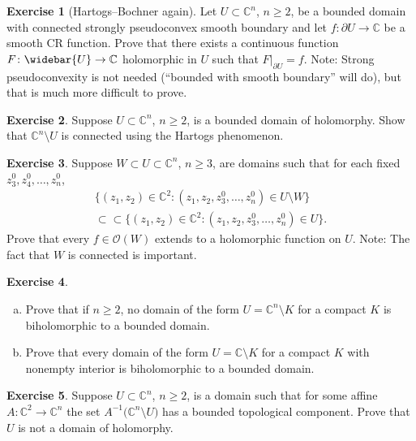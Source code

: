 \documentclass[12pt,openany]{book}
\newcommand{\C}{{\mathbb{C}}}
\newcommand{\sO}{{\mathscr{O}}}
\theoremstyle{plain}
\theoremstyle{remark}
\theoremstyle{definition}
\newenvironment{exbox}{%
    \def\FrameCommand{\vrule width 1pt \relax\hspace{10pt}}%
    \MakeFramed{\advance\hsize-\width\FrameRestore}%
}{%
    \endMakeFramed
}
\newenvironment{exparts}{%
    \leavevmode\begin{enumerate}[a),noitemsep,topsep=0pt,parsep=0pt,partopsep=0pt]
}{%
    \end{enumerate}
}
\theoremstyle{exercise}
\newtheorem{exercise}{Exercise}[section]
\theoremstyle{example}
\begin{document}
\begin{exbox}
\begin{exercise}[Hartogs--Bochner again] \label{exercise:HartogsBochnerSPCVX}
Let $U \subset \C^n$, $n \geq 2$, be a bounded domain with connected strongly
pseudoconvex smooth boundary
and let $f \colon \partial U \to \C$ be a smooth CR function.  Prove
that there exists a continuous function $F \colon \widebar{U} \to \C$
holomorphic in $U$
such that $F|_{\partial U} = f$.
Note: Strong pseudoconvexity is not needed (``bounded with smooth boundary''
will do), but that is much more difficult to prove.
\end{exercise}

\begin{exercise}
Suppose $U \subset \C^n$, $n \geq 2$, is a bounded domain of
holomorphy.  Show that $\C^n \setminus U$ is connected using the
Hartogs phenomenon.
\end{exercise}

\begin{exercise}
Suppose $W \subset U \subset \C^n$, $n \geq 3$, are domains such that
for each fixed $z_3^0,z_4^0,\ldots,z_n^0$,
\begin{multline*}
\bigl\{ (z_1,z_2) \in \C^2 :
(z_1,z_2,z_3^0,\ldots,z_n^0) \in U \setminus W
\bigr\}
\\
\subset \subset
\bigl\{ (z_1,z_2) \in \C^2 :
(z_1,z_2,z_3^0,\ldots,z_n^0) \in U
\bigr\} .
\end{multline*}
Prove that every $f \in \sO(W)$ extends to a holomorphic function on
$U$.  Note: The fact that $W$ is connected is important.
\end{exercise}

\begin{exercise}
\begin{exparts}
\item
Prove that if $n \geq 2$, no domain of the form $U = \C^n \setminus K$
for a compact $K$ is biholomorphic to a bounded domain.
\item
Prove that every domain of the form $U = \C \setminus K$
for a compact $K$ with nonempty interior is biholomorphic to a bounded domain.
\end{exparts}
\end{exercise}

\begin{exercise}
Suppose $U \subset \C^n$, $n \geq 2$, is a domain such that
for some affine $A \colon \C^2 \to \C^n$
the set $A^{-1}\bigl(\C^n \setminus U\bigr)$ has a bounded
topological component.  Prove that $U$ is not a domain of holomorphy.
\end{exercise}
\end{exbox}
\end{document}

